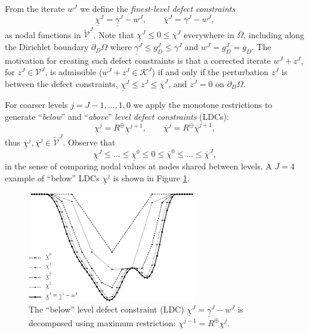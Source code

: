 \documentclass[letterpaper,final,12pt,reqno]{amsart}
\theoremstyle{cstyle}
\theoremstyle{cstyle*}
\theoremstyle{dstyle}
\numberwithin{equation}{section}
\numberwithin{figure}{section}
\numberwithin{table}{section}
\numberwithin{theorem}{section}
\newcommand{\cK}{\mathcal{K}}
\newcommand{\cV}{\mathcal{V}}
\newcommand{\maxR}{R^{\bm{\oplus}}}
\newcommand{\minR}{R^{\bm{\ominus}}}
\begin{document}
From the iterate $w^J$ we define the \emph{finest-level defect constraints}
\begin{equation}
\underline{\chi}^J = \underline{\gamma}^J - w^J, \qquad \overline{\chi}^J = \overline{\gamma}^J - w^J, \label{eq:fe:defectconstraints}
\end{equation}
as nodal functions in $\tilde{\mathcal{V}}^J$.  Note that $\underline{\chi}^J \le 0 \le \overline{\chi}^J$ everywhere in $\overline{\Omega}$, including along the Dirichlet boundary $\partial_D\Omega$ where $\underline{\gamma}^J \le g_D^J \le \overline{\gamma}^J$ and $w^J = g_D^J = g_D$.  The motivation for creating such defect constraints \cite{GraeserKornhuber2009} is that a corrected iterate $w^J + z^J$, for $z^J\in\cV^J$, is admissible ($w^J + z^J \in \cK^J$) if and only if the perturbation $z^J$ is between the defect constraints, $\underline{\chi}^J \le z^J \le \overline{\chi}^J$, and $z^J=0$ on $\partial_D\Omega$.

For coarser levels $j=J-1,\dots,1,0$ we apply the monotone restrictions to generate ``\emph{below}'' and ``\emph{above}'' \emph{level defect constraints} (LDCs):
\begin{equation}
\underline{\chi}^{j} = \maxR \underline{\chi}^{j+1}, \qquad \overline{\chi}^{j} = \minR \overline{\chi}^{j+1}, \label{eq:fe:chilevels}
\end{equation}
thus $\underline{\chi}^{j},\overline{\chi}^{j} \in \tilde{\mathcal{V}}^J$.  Observe that
\begin{equation}
\underline{\chi}^{J} \le \dots \le \underline{\chi}^0 \le 0 \le \overline{\chi}^0 \le \dots \le \overline{\chi}^J, \label{eq:fe:chiordering}
\end{equation}
in the sense of comparing nodal values at nodes shared between levels.  A $J=4$ example of ``below'' LDCs $\underline{\chi}^j$ is shown in Figure \ref{fig:chiphilevels}.

\begin{figure}[ht]
\includegraphics[width=0.65\textwidth]{fixfigs/chiphilevels.pdf}
\caption{The ``below'' level defect constraint (LDC) $\underline{\chi}^J = \underline{\gamma}^J - w^J$ is decomposed using maximum restriction: $\underline{\chi}^{j-1} = \maxR \underline{\chi}^j$.}
\label{fig:chiphilevels}
\end{figure}
\end{document}
